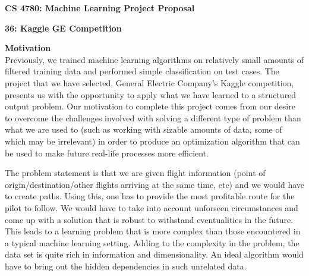 \documentclass{article}[9pt]
\begin{document}
\begin{framed}
\noindent
\large{\textbf{CS 4780: Machine Learning \hfill Project Proposal}}
\end{framed}
\begin{center}
	\textbf{\Large{36: Kaggle GE Competition}}
\end{center}
\noindent\Large{\textbf{Motivation}}\\
\noindent Previously, we trained machine learning algorithms on relatively small amounts of filtered training data and performed simple classification on test cases. The project that we have selected, General Electric Company's Kaggle competition, presents us with the opportunity to apply what we have learned to a structured output problem. Our motivation to complete this project comes from our desire to overcome the challenges involved with solving a different type of problem than what we are used to (such as working with sizable amounts of data, some of which may be irrelevant) in order to produce an optimization algorithm that can be used to make future real-life processes more efficient.

The problem statement is that we are given flight information (point of origin/destination/other flights arriving at the same time, etc) and we would have to create paths. Using this, one has to provide the most profitable route for the pilot to follow. We would have to take into account unforseen circumstances and come up with a solution that is robust to withstand eventualities in the future. This leads to a learning problem that is more complex than those encountered in a typical machine learning setting. Adding to the complexity in the problem, the data set is quite rich in information and dimensionality. An ideal algorithm would have to bring out the hidden dependencies in such unrelated data.
\end{document}
